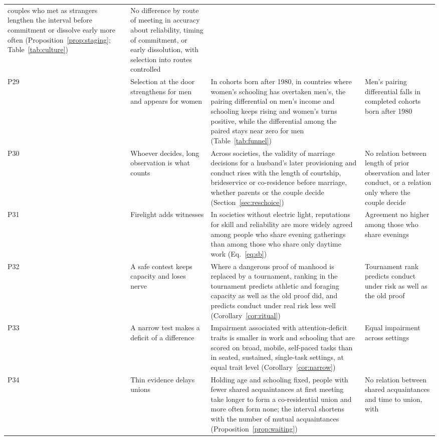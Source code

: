 \begin{table}[tp]
\begin{tabularx}{\textwidth}{@{}P{0.028\textwidth}P{0.19\textwidth}LP{0.25\textwidth}@{}}
couples who met as strangers lengthen the interval before commitment or dissolve early more often
(Proposition~\ref{prop:staging}; Table~\ref{tab:culture}) & No difference by route of meeting in accuracy about
reliability, timing of commitment, or early dissolution, with selection into routes controlled\\
P29 & Selection at the door strengthens for men and appears for women & In cohorts born after 1980, in countries where women's schooling
has overtaken men's, the pairing differential on men's income and schooling keeps rising and women's turns positive, while
the differential among the paired stays near zero for men (Table~\ref{tab:funnel}) & Men's pairing differential falls in
completed cohorts born after 1980\\
P30 & Whoever decides, long observation is what counts & Across societies, the validity of marriage decisions for a
husband's later provisioning and conduct rises with the length of courtship, brideservice or co-residence before marriage,
whether parents or the couple decide (Section~\ref{sec:reschoice}) & No relation between length of prior observation and
later conduct, or a relation only where the couple decide\\
P31 & Firelight adds witnesses & In societies without electric light, reputations for skill and reliability are more
widely agreed among people who share evening gatherings than among those who share only daytime work
(Eq.~\ref{eq:sb}) & Agreement no higher among those who share evenings\\
P32 & A safe contest keeps capacity and loses nerve & Where a dangerous proof of manhood is replaced by a tournament,
ranking in the tournament predicts athletic and foraging capacity as well as the old proof did, and predicts conduct
under real risk less well (Corollary~\ref{cor:ritual}) & Tournament rank predicts conduct under risk as well as the old
proof\\
P33 & A narrow test makes a deficit of a difference & Impairment associated with attention-deficit traits is smaller in
work and schooling that are scored on broad, mobile, self-paced tasks than in seated, sustained, single-task settings, at
equal trait level (Corollary~\ref{cor:narrow}) & Equal impairment across settings\\
P34 & Thin evidence delays unions & Holding age and schooling fixed, people with fewer shared acquaintances at first
meeting take longer to form a co-residential union and more often form none; the interval shortens with the number of
mutual acquaintances (Proposition~\ref{prop:waiting}) & No relation between shared acquaintances and time to union, with

\end{tabularx}
\end{table}
